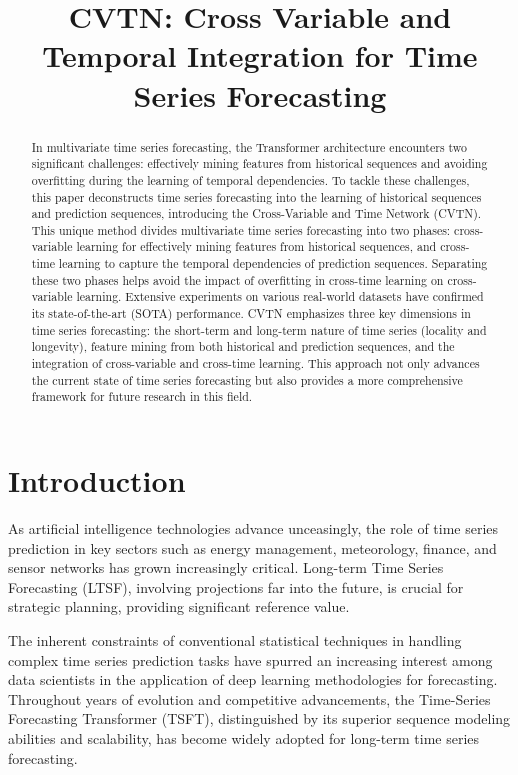 
\title{CVTN: Cross Variable and Temporal Integration for Time Series Forecasting}
\maketitle

\begin{abstract}
  In multivariate time series forecasting, the Transformer architecture encounters two significant challenges: effectively mining features from historical sequences and avoiding overfitting during the learning of temporal dependencies. To tackle these challenges, this paper deconstructs time series forecasting into the learning of historical sequences and prediction sequences, introducing the Cross-Variable and Time Network (CVTN). This unique method divides multivariate time series forecasting into two phases: cross-variable learning for effectively mining features from historical sequences, and cross-time learning to capture the temporal dependencies of prediction sequences. Separating these two phases helps avoid the impact of overfitting in cross-time learning on cross-variable learning. Extensive experiments on various real-world datasets have confirmed its state-of-the-art (SOTA) performance. CVTN emphasizes three key dimensions in time series forecasting: the short-term and long-term nature of time series (locality and longevity), feature mining from both historical and prediction sequences, and the integration of cross-variable and cross-time learning. This approach not only advances the current state of time series forecasting but also provides a more comprehensive framework for future research in this field.
\end{abstract}


\section{Introduction}
As artificial intelligence technologies advance unceasingly, the role of time series prediction in key sectors such as energy management\cite{gao2023adaptive}, meteorology\cite{meenal2022weather}, finance\cite{lopez2023can}, and sensor networks\cite{mejia2020prediction} has grown increasingly critical. Long-term Time Series Forecasting (LTSF), involving projections far into the future, is crucial for strategic planning, providing significant reference value. 

The inherent constraints of conventional statistical techniques in handling complex time series prediction tasks have spurred an increasing interest among data scientists in the application of deep learning methodologies for forecasting. Throughout years of evolution and competitive advancements, the Time-Series Forecasting Transformer\cite{vaswani2017attention} (TSFT), distinguished by its superior sequence modeling abilities and scalability, has become widely adopted for long-term time series forecasting.

